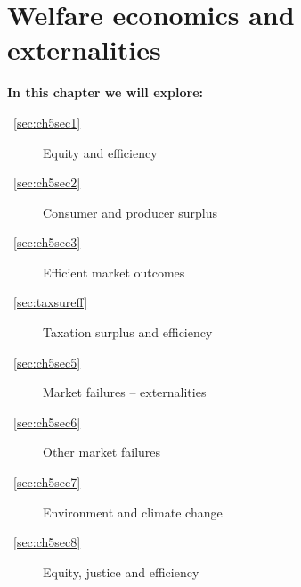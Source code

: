 \chapter{Welfare economics and externalities} \label{chap:welfare}

\begin{topics}
\textbf{In this chapter we will explore:}
\begin{description}
\item [~\ref{sec:ch5sec1}] Equity and efficiency
\item [~\ref{sec:ch5sec2}] Consumer and producer surplus
\item [~\ref{sec:ch5sec3}] Efficient market outcomes
\item [~\ref{sec:taxsureff}] Taxation surplus and efficiency
\item [~\ref{sec:ch5sec5}] Market failures -- externalities
\item [~\ref{sec:ch5sec6}] Other market failures
\item [~\ref{sec:ch5sec7}] Environment and climate change
\item [~\ref{sec:ch5sec8}] Equity, justice and efficiency
\end{description}
\end{topics}